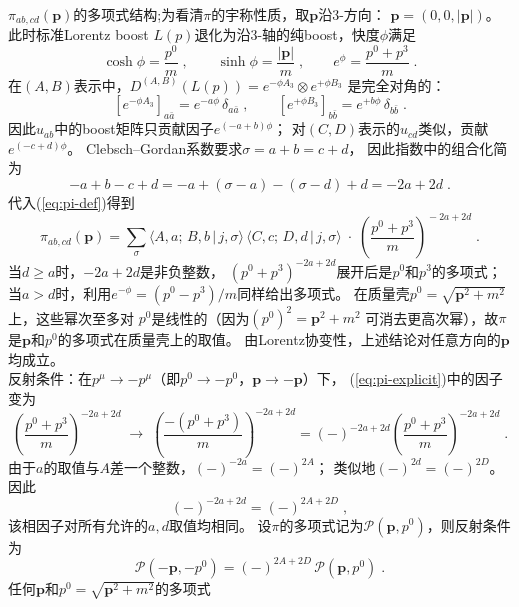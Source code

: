 \vspace{2ex}
\\
$\pi_{ab,cd}(\boldsymbol{p})$的多项式结构;为看清$\pi$的宇称性质，取$\boldsymbol{p}$沿$3$-方向：
$\boldsymbol{p}=(0,0,|\boldsymbol{p}|)$。此时标准Lorentz boost
$L(p)$退化为沿$3$-轴的纯boost，快度$\phi$满足
\[
  \cosh\phi = \frac{p^{0}}{m}\;,\qquad
  \sinh\phi = \frac{|\boldsymbol{p}|}{m}\;,\qquad
  e^{\phi} = \frac{p^{0}+p^{3}}{m}\;.
\]
在$(A,B)$表示中，$D^{(A,B)}(L(p))=e^{-\phi A_{3}}\otimes e^{+\phi B_{3}}$
是完全对角的：
\[
  [e^{-\phi A_{3}}]_{a\bar{a}} = e^{-a\phi}\,\delta_{a\bar{a}}\;,\qquad
  [e^{+\phi B_{3}}]_{b\bar{b}} = e^{+b\phi}\,\delta_{b\bar{b}}\;.
\]
因此$u_{ab}$中的boost矩阵只贡献因子$e^{(-a+b)\phi}$；
对$(C,D)$表示的$u_{cd}$类似，贡献$e^{(-c+d)\phi}$。
Clebsch--Gordan系数要求$\sigma = a+b = c+d$，
因此指数中的组合化简为
\[
  -a+b-c+d = -a+(\sigma-a)-(\sigma-d)+d = -2a+2d\;.
\]
代入(\ref{eq:pi-def})得到
\begin{equation}\label{eq:pi-explicit}
  \pi_{ab,cd}(\boldsymbol{p})
  = \sum_{\sigma}\langle A,a;\,B,b\,|\,j,\sigma\rangle
    \,\langle C,c;\,D,d\,|\,j,\sigma\rangle
    \;\cdot\;\left(\frac{p^{0}+p^{3}}{m}\right)^{\!-2a+2d}\;.
\end{equation}
当$d\geqslant a$时，$-2a+2d$是非负整数，
$(p^{0}+p^{3})^{-2a+2d}$展开后是$p^{0}$和$p^{3}$的多项式；
当$a > d$时，利用$e^{-\phi}=(p^{0}-p^{3})/m$同样给出多项式。
在质量壳$p^{0}=\sqrt{\boldsymbol{p}^{2}+m^{2}}$上，这些幂次至多对
$p^{0}$是线性的（因为$(p^{0})^{2}=\boldsymbol{p}^{2}+m^{2}$
可消去更高次幂），故$\pi$是$\boldsymbol{p}$和$p^{0}$的多项式在质量壳上的取值。
由Lorentz协变性，上述结论对任意方向的$\boldsymbol{p}$均成立。
\vspace{2ex}\\
反射条件：在$p^{\mu}\to -p^{\mu}$（即$p^{0}\to -p^{0}$，$\boldsymbol{p}\to -\boldsymbol{p}$）下，
(\ref{eq:pi-explicit})中的因子变为
\[
  \left(\frac{p^{0}+p^{3}}{m}\right)^{-2a+2d}
  \;\longrightarrow\;
  \left(\frac{-(p^{0}+p^{3})}{m}\right)^{-2a+2d}
  = (-)^{-2a+2d}\left(\frac{p^{0}+p^{3}}{m}\right)^{-2a+2d}\;.
\]
由于$a$的取值与$A$差一个整数，$(-)^{-2a}=(-)^{2A}$；
类似地$(-)^{2d}=(-)^{2D}$。因此
\[
  (-)^{-2a+2d} = (-)^{2A+2D}\;,
\]
该相因子对所有允许的$a,d$取值均相同。
设$\pi$的多项式记为$\mathscr{P}(\boldsymbol{p},p^{0})$，则反射条件为
\begin{equation}\label{eq:reflect}
  \mathscr{P}(-\boldsymbol{p},-p^{0})
  = (-)^{2A+2D}\,\mathscr{P}(\boldsymbol{p},p^{0})\;.
\end{equation}
任何$\boldsymbol{p}$和$p^{0}=\sqrt{\boldsymbol{p}^{2}+m^{2}}$的多项式
